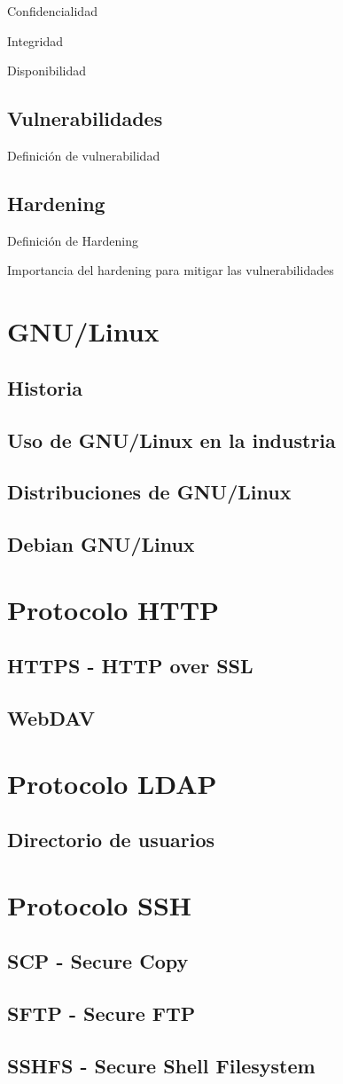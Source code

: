 Confidencialidad

Integridad

Disponibilidad

  \subsection {Vulnerabilidades}

Definici\'{o}n de vulnerabilidad

  \subsection {Hardening}

Definici\'{o}n de Hardening

Importancia del hardening para mitigar las vulnerabilidades

\section {GNU/Linux}
  \subsection {Historia}
  \subsection {Uso de GNU/Linux en la industria}
  \subsection {Distribuciones de GNU/Linux}
  \subsection {Debian GNU/Linux}
\section {Protocolo HTTP}
  \subsection {HTTPS - HTTP over SSL}
  \subsection {WebDAV}
\section {Protocolo LDAP}
  \subsection {Directorio de usuarios}
\section {Protocolo SSH}
  \subsection {SCP - Secure Copy}
  \subsection {SFTP - Secure FTP}
  \subsection {SSHFS - Secure Shell Filesystem}

